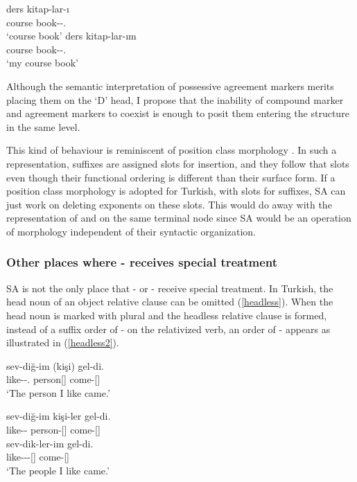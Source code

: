 \begin{exe}
    \ex \label{plural}
    \begin{xlist}
        \ex \gll ders kitap-lar-ı \\ course book-{\Pl}-{\Poss.\Tsg} \\
        \glt `course book'
        \ex \gll ders kitap-lar-ım \\ course book-{\Pl}-{\Poss.\Fsg} \\
        \glt `my course book'
    \end{xlist}
\end{exe}

Although the semantic interpretation of possessive agreement markers merits placing them on the `D' head, I propose that the inability of compound marker and agreement markers to coexist is enough to posit them entering the structure in the same level.

This kind of behaviour is reminiscent of position class morphology \citep{inkelas1993nimboran,stump1993position}. In such a representation, suffixes are assigned slots for insertion, and they follow that slots even though their functional ordering is different than their surface form. If a position class morphology is adopted for Turkish, with slots for suffixes, SA can just work on deleting exponents on these slots. This would do away with the representation of {\Pl} and {\Poss} on the same terminal node since SA would be an operation of morphology independent of their syntactic organization.


\subsubsection{Other places where {\Pl-\Poss} receives special treatment}

SA is not the only place that {\Pl-\Poss} or {\Pl-\Agr} receive special treatment. In Turkish, the head noun of an object relative clause can be omitted (\ref{headless}). When the head noun is marked with plural and the headless relative clause is formed, instead of a suffix order of {\Poss-\Pl} on the relativized verb, an order of {\Pl-\Poss} appears as illustrated in (\ref{headless2}).

\begin{exe}
    \ex \label{headless}
    \gll sev-diğ-im (kişi) gel-di. \\ 
    like-{\Pp}-{\Poss.\Fsg} person[{\Nom}] come-{\Pst}[{\Tsg}] \\
    \glt `The person I like came.'
    
    \ex \label{headless2}
    \begin{xlist}
    \ex \gll sev-diğ-im kişi-ler gel-di. \\ 
    like-{\Pp}-{\Fsg} person-{\Pl}[{\Nom}] come-{\Pst}[{\Tsg}] \\
    
    \ex \gll sev-dik-ler-im gel-di. \\ 
    like-{\Pp}-{\Pl}-{\Fsg}[{\Nom}] come-{\Pst}[{\Tpl}] \\
    \glt `The people I like came.'
    \end{xlist}
\end{exe}

